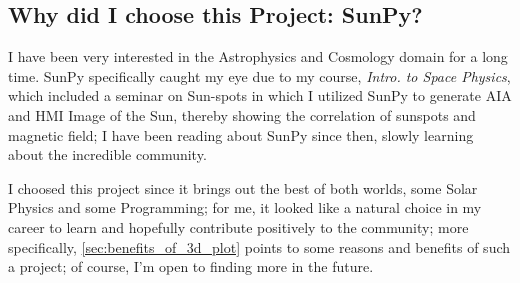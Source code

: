 \subsection{Why did I choose this Project: SunPy?}





    I have been very interested in the Astrophysics and Cosmology domain for a long time. 
    SunPy specifically caught my eye due to my course, \textit{Intro. to Space Physics}, which included a seminar on Sun-spots in which I utilized SunPy to generate AIA and HMI Image of the Sun, thereby showing the correlation of sunspots and magnetic field; I have been reading about SunPy since then, slowly learning about the incredible community.
    
    I choosed this project since it brings out the best of both worlds, some Solar Physics and some Programming; for me, it looked like a natural choice in my career to learn and hopefully contribute positively to the community; more specifically,  \autoref{sec:benefits_of_3d_plot} points to some reasons and benefits of such a project; of course, I'm open to finding more in the future.